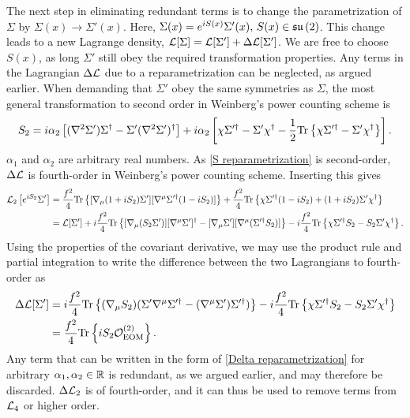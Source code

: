 The next step in eliminating redundant terms is to change the parametrization of $\Sigma$ by $\Sigma(x) \rightarrow \Sigma'(x)$.
Here, $ \Sigma(x) = e^{iS(x)} \Sigma'(x), \, S(x) \in \mathfrak{su}\left(2\right)$. This change leads to a new Lagrange density, $\mathcal{L}[\Sigma] = \mathcal{L}[\Sigma'] + \Delta \mathcal{L}[\Sigma']$.
We are free to choose $S(x)$, as long $\Sigma'$ still obey the required transformation properties.
Any terms in the Lagrangian $\Delta \mathcal{L}$ due to a reparametrization can be neglected, as argued earlier.
When demanding that $\Sigma'$ obey the same symmetries as $\Sigma$,
the most general transformation to second order in Weinberg's power counting scheme  is~\cite{schererIntroductionChiralPerturbation2002}
%
\begin{equation}
    \label{S reparametrization}
    S_{2} = 
    i \alpha_2 
    \left[
        (\nabla^2 \Sigma') \Sigma^\dagger - \Sigma' (\nabla^2 {\Sigma'})^\dagger
    \right]
    + i \alpha_2
    \left[
        \chi \Sigma'^\dagger - \Sigma' \chi^\dagger 
        - \frac{1}{2} \text{Tr} \left\{ \chi \Sigma'^\dagger - \Sigma' \chi^\dagger \right\}
    \right].
\end{equation}
%
$\alpha_1$ and $\alpha_2$ are arbitrary real numbers. As \autoref{S reparametrization} is second-order, $\Delta \mathcal{L}$ is fourth-order in Weinberg's power counting scheme.
Inserting this gives
%
%
\begin{align*}
    \mathcal{L}_2\left[e^{i S_2}\Sigma '\right]
    & =
    \frac{f^2}{4}\text{Tr} \left\{ [\nabla_\mu (1 +i S_2)\Sigma'][\nabla^\mu \Sigma'^\dagger  (1 - i S_2)] \right\}
    + \frac{f^2}{4} \text{Tr} \left\{ \chi\Sigma'^\dagger (1 - i S_2) + (1 +i S_2)\Sigma' \chi^\dagger \right\} \\
    & = \mathcal{L}[\Sigma'] + 
    i \frac{f^2}{4}
    \text{Tr} \left\{ [\nabla_\mu (S_2\Sigma')][\nabla^\mu\Sigma']^\dagger 
    -  [\nabla_\mu\Sigma'][\nabla^\mu (\Sigma'^\dagger  S_2) ] \right\}
    - i \frac{f^2}{4} \text{Tr} \left\{ \chi \Sigma'^\dagger S_2 - S_2 \Sigma' \chi^\dagger \right\}.
\end{align*}
%
%
Using the properties of the covariant derivative, we may use the product rule and partial integration to write the difference between the two Lagrangians to fourth-order as
%
\begin{align}
    \nonumber
    \Delta \mathcal{L}[\Sigma'] 
    & = 
    i \frac{f^2}{4}
    \text{Tr} \left\{ 
        (\nabla_\mu S_2)
        (\Sigma' \nabla^\mu \Sigma'^\dagger - (\nabla^\mu \Sigma') \Sigma'^\dagger) 
     \right\}
    - i \frac{f^2}{4} \text{Tr} \left\{ \chi \Sigma'^\dagger  S_2 - S_2 \Sigma' \chi^\dagger \right\} \\
    & = 
    \label{Delta reparametrization}
    \frac{f^2}{4} \text{Tr} \left\{ i S_2 \mathcal{O}_\mathrm{EOM}^{(2)} \right\}.
\end{align}
%
Any term that can be written in the form of \autoref{Delta reparametrization} for arbitrary $\alpha_1, \alpha_2 \in \mathbb{R}$ is redundant, as we argued earlier, and may therefore be discarded.
$\Delta \mathcal{L}_2$ is of fourth-order, and it can thus be used to remove terms from $\mathcal{L}_4$ or higher order.



